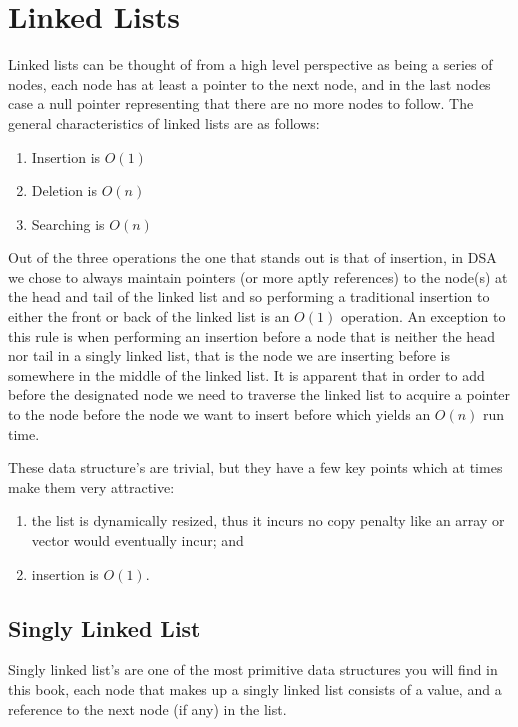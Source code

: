 \chapter{Linked Lists}
Linked lists can be thought of from a high level perspective as being a series of nodes, each node has at least a pointer to the next node, and in the last nodes case a null pointer representing that there are no more nodes to follow.
The general characteristics of linked lists are as follows:

\begin{enumerate}
\item Insertion is $O(1)$
\item Deletion is $O(n)$
\item Searching is $O(n)$
\end{enumerate}

Out of the three operations the one that stands out is that of insertion, in DSA we chose to always maintain pointers (or more aptly references) to the node(s) at the head and tail of the linked list and so performing a traditional insertion to either the front or back of the linked list is an $O(1)$ operation. An exception to this rule is when performing an insertion before a node that is neither the head nor tail in a singly linked list, that is the node we are inserting before is somewhere in the middle of the linked list. It is apparent that in order to add before the designated node we need to traverse the linked list to acquire a pointer to the node before the node we want to insert before which yields an $O(n)$ run time.

These data structure's are trivial, but they have a few key points which at times make them very attractive: 
\begin{enumerate}
\item the list is dynamically resized, thus it incurs no copy penalty like an array or vector would eventually incur; and
\item insertion is $O(1)$.
\end{enumerate}

\section{Singly Linked List}
Singly linked list's are one of the most primitive data structures you will find in this book, each node that makes up a singly linked list consists of a value, and a reference to the next node (if any) in the list. 

